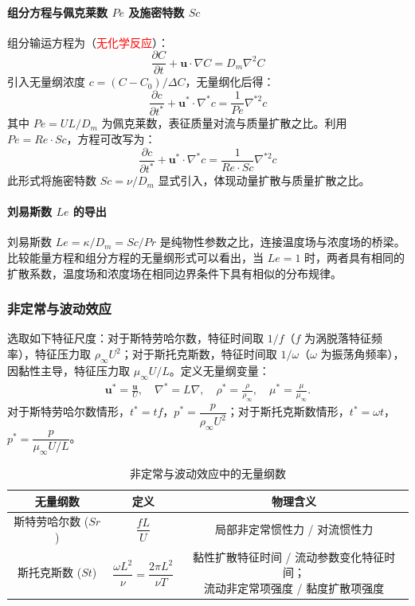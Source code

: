 \paragraph{组分方程与佩克莱数 $Pe$ 及施密特数 $Sc$}
组分输运方程为（\textcolor{red}{无化学反应}）：
\begin{equation}
\frac{\partial C}{\partial t} + \mathbf{u} \cdot \nabla C = D_m \nabla^2 C
\end{equation}
引入无量纲浓度 $c = (C - C_0)/\Delta C$，无量纲化后得：
\begin{equation}
\frac{\partial c}{\partial t^*} + \mathbf{u}^* \cdot \nabla^* c = \frac{1}{Pe} \nabla^{*2} c
\end{equation}
其中 $Pe = UL/D_m$ 为佩克莱数，表征质量对流与质量扩散之比。利用 $Pe = Re \cdot Sc$，方程可改写为：
\begin{equation}
\frac{\partial c}{\partial t^*} + \mathbf{u}^* \cdot \nabla^* c = \frac{1}{Re \cdot Sc} \nabla^{*2} c
\end{equation}
此形式将施密特数 $Sc = \nu/D_m$ 显式引入，体现动量扩散与质量扩散之比。

\paragraph{刘易斯数 $Le$ 的导出}
刘易斯数 $Le = \kappa/D_m = Sc/Pr$ 是纯物性参数之比，连接温度场与浓度场的桥梁。
比较能量方程和组分方程的无量纲形式可以看出，当 $Le = 1$ 时，两者具有相同的扩散系数，温度场和浓度场在相同边界条件下具有相似的分布规律。


\subsubsection{非定常与波动效应}

选取如下特征尺度：对于斯特劳哈尔数，特征时间取 $1/f$（$f$ 为涡脱落特征频率），特征压力取 $\rho_\infty U^2$；对于斯托克斯数，特征时间取 $1/\omega$（$\omega$ 为振荡角频率），因黏性主导，特征压力取 $\mu_\infty U/L$。定义无量纲变量：
\begin{align*}
    \mathbf{u}^* = \frac{\mathbf{u}}{U}, \quad 
    \nabla^* = L\nabla ,\quad 
    \rho^* = \frac{\rho}{\rho_\infty}, \quad 
    \mu^* = \frac{\mu}{\mu_\infty}.
\end{align*}
对于斯特劳哈尔数情形，$t^* = t f$，$p^* = \dfrac{p}{\rho_\infty U^2}$；对于斯托克斯数情形，$t^* = \omega t$，$p^* = \dfrac{p}{\mu_\infty U/L}$。

\begin{table}[h]
\centering
\caption{非定常与波动效应中的无量纲数}
\renewcommand{\arraystretch}{1.5}
\begin{tabular}{|c|c|c|}
\hline
\textbf{无量纲数} & \textbf{定义} & \textbf{物理含义} \\
\hline
斯特劳哈尔数 ($Sr$) & $\dfrac{fL}{U}$ & 局部非定常惯性力 / 对流惯性力\\
\hline
斯托克斯数 ($St$) & $\dfrac{\omega L^2}{\nu} = \dfrac{2\pi L^2}{\nu T}$
 & \makecell{黏性扩散特征时间 / 流动参数变化特征时间；\\流动非定常项强度 / 黏度扩散项强度} \\
\hline
\end{tabular}
\end{table}

